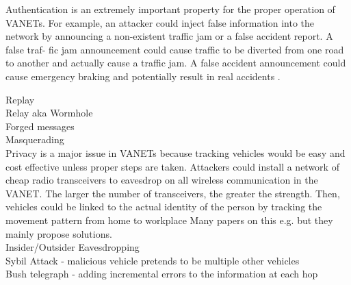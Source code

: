 
Authentication is an extremely important property for the proper operation of VANETs. For example, an attacker could
inject false information into the network by announcing a non-existent traffic jam or a false accident report. A false traf- fic jam announcement could cause traffic to be diverted from one road to another and actually cause a traffic jam. A false accident announcement could cause emergency braking and potentially result in real accidents \cite{toor2008vehicle}.


Replay\\
Relay aka Wormhole \cite{raya2007securing} \\
Forged messages\\
Masquerading \cite{laurendeau2006threats}\\

Privacy is a major issue in VANETs because tracking vehicles would be easy and cost effective unless proper steps are taken. Attackers could install a network of cheap radio transceivers to eavesdrop on all wireless communication in the VANET. The larger the number of transceivers, the greater the strength. Then, vehicles could be linked to the actual identity of the person by tracking the movement pattern from home to workplace \cite{toor2008vehicle}
Many papers on this e.g. \cite{dotzer2006privacy} but they mainly propose solutions.\\


Insider/Outsider Eavesdropping \cite{laurendeau2006threats}\\


Sybil Attack - malicious vehicle pretends to be multiple other vehicles \cite{zhou2007privacy}\\

Bush telegraph - adding incremental errors to the information at each hop\cite{raya2007securing}\\

